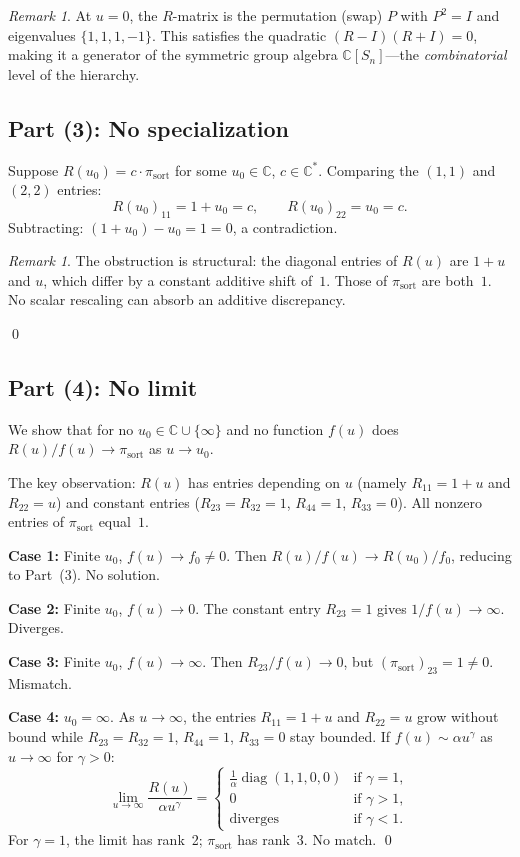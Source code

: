 \documentclass[11pt]{article}
\theoremstyle{remark}
\newtheorem{remark}[theorem]{Remark}
\newcommand{\CC}{\mathbb{C}}
\newcommand{\pisort}{\pi_{\mathrm{sort}}}
\begin{document}
\begin{remark}
At $u = 0$, the $R$-matrix is the permutation (swap) $P$ with $P^2 = I$
and eigenvalues $\{1,1,1,-1\}$. This satisfies the quadratic
$(R-I)(R+I) = 0$, making it a generator of the symmetric group algebra
$\CC[S_n]$---the \emph{combinatorial} level of the hierarchy.
\end{remark}

\subsection{Part (3): No specialization}

Suppose $R(u_0) = c \cdot \pisort$ for some $u_0 \in \CC$, $c \in \CC^*$.
Comparing the $(1,1)$ and $(2,2)$ entries:
\[
  R(u_0)_{11} = 1 + u_0 = c, \qquad R(u_0)_{22} = u_0 = c.
\]
Subtracting: $(1+u_0) - u_0 = 1 = 0$, a contradiction.

\begin{remark}
The obstruction is structural: the diagonal entries of $R(u)$ are $1+u$
and $u$, which differ by a constant additive shift of~$1$. Those of
$\pisort$ are both~$1$. No scalar rescaling can absorb an additive
discrepancy.
\end{remark}
\qed

\subsection{Part (4): No limit}

We show that for no $u_0 \in \CC \cup \{\infty\}$ and no function $f(u)$
does $R(u)/f(u) \to \pisort$ as $u \to u_0$.

The key observation: $R(u)$ has entries depending on $u$ (namely
$R_{11} = 1+u$ and $R_{22} = u$) and constant entries ($R_{23} = R_{32} = 1$,
$R_{44} = 1$, $R_{33} = 0$). All nonzero entries of $\pisort$ equal~$1$.

\textbf{Case 1:} Finite $u_0$, $f(u) \to f_0 \neq 0$. Then
$R(u)/f(u) \to R(u_0)/f_0$, reducing to Part~(3). No solution.

\textbf{Case 2:} Finite $u_0$, $f(u) \to 0$. The constant entry
$R_{23} = 1$ gives $1/f(u) \to \infty$. Diverges.

\textbf{Case 3:} Finite $u_0$, $f(u) \to \infty$. Then
$R_{23}/f(u) \to 0$, but $(\pisort)_{23} = 1 \neq 0$. Mismatch.

\textbf{Case 4:} $u_0 = \infty$. As $u \to \infty$, the entries
$R_{11} = 1+u$ and $R_{22} = u$ grow without bound while
$R_{23} = R_{32} = 1$, $R_{44} = 1$, $R_{33} = 0$ stay bounded.
If $f(u) \sim \alpha u^\gamma$ as $u \to \infty$ for $\gamma > 0$:
\[
  \lim_{u \to \infty} \frac{R(u)}{\alpha u^\gamma} =
  \begin{cases}
    \frac{1}{\alpha}\operatorname{diag}(1,1,0,0) & \text{if } \gamma = 1, \\
    0 & \text{if } \gamma > 1, \\
    \text{diverges} & \text{if } \gamma < 1.
  \end{cases}
\]
For $\gamma = 1$, the limit has rank~2; $\pisort$ has rank~3. No match.
\qed
\end{document}
